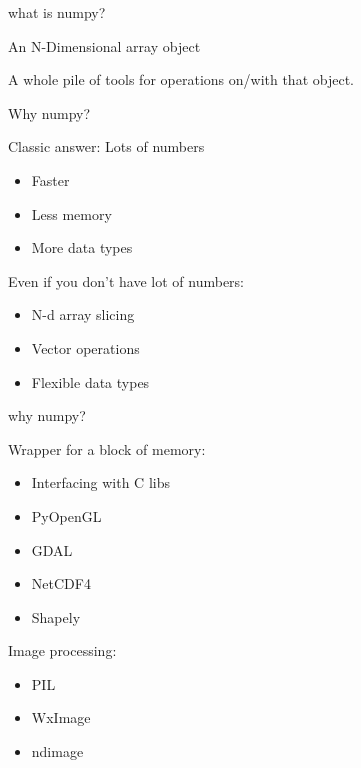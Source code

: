 \documentclass{beamer}
\begin{document}
\begin{frame}[fragile]{what is numpy?}

{\Large An N-Dimensional array object}

\vfill
{\Large A whole pile of tools for operations on/with that object.}

\vfill

\end{frame} 

\begin{frame}[fragile]{Why numpy?}

{\Large Classic answer: Lots of numbers}

\vfill
\begin{itemize}
  \item Faster
  \item Less memory
  \item More data types
\end{itemize}

\vfill
{\Large Even if you don't have lot of numbers:}
\begin{itemize}
  \item N-d array slicing
  \item Vector operations
  \item Flexible data types
\end{itemize}

\end{frame} 

\begin{frame}[fragile]{why numpy?}

{\Large Wrapper for a block of memory:}

\begin{itemize}
  \item Interfacing with C libs
  \item PyOpenGL
  \item GDAL
  \item NetCDF4
  \item Shapely
\end{itemize}

{\Large Image processing:}
\begin{itemize}
  \item PIL
  \item WxImage
  \item ndimage
\end{itemize}

\end{frame} 
\end{document}
